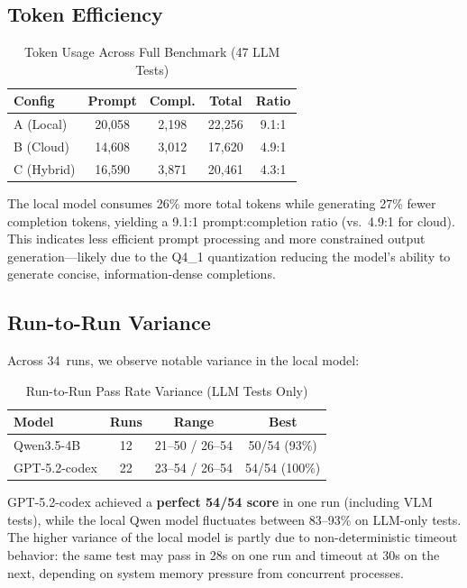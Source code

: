\documentclass[conference]{IEEEtran}
\begin{document}
\subsection{Token Efficiency}

\begin{table}[h]
\centering
\caption{Token Usage Across Full Benchmark (47 LLM Tests)}
\label{tab:tokens}
\begin{tabular}{lcccc}
\toprule
\textbf{Config} & \textbf{Prompt} & \textbf{Compl.} & \textbf{Total} & \textbf{Ratio} \\
\midrule
A (Local) & 20,058 & 2,198 & 22,256 & 9.1:1 \\
B (Cloud) & 14,608 & 3,012 & 17,620 & 4.9:1 \\
C (Hybrid) & 16,590 & 3,871 & 20,461 & 4.3:1 \\
\bottomrule
\end{tabular}
\end{table}

The local model consumes 26\% more total tokens while generating 27\%
fewer completion tokens, yielding a 9.1:1 prompt:completion ratio
(vs.\ 4.9:1 for cloud). This indicates less efficient prompt processing
and more constrained output generation---likely due to the Q4\_1
quantization reducing the model's ability to generate concise,
information-dense completions.

\subsection{Run-to-Run Variance}

Across 34~runs, we observe notable variance in the local model:

\begin{table}[h]
\centering
\caption{Run-to-Run Pass Rate Variance (LLM Tests Only)}
\label{tab:variance}
\begin{tabular}{lccc}
\toprule
\textbf{Model} & \textbf{Runs} & \textbf{Range} & \textbf{Best} \\
\midrule
Qwen3.5-4B & 12 & 21--50 / 26--54 & 50/54 (93\%) \\
GPT-5.2-codex & 22 & 23--54 / 26--54 & 54/54 (100\%) \\
\bottomrule
\end{tabular}
\end{table}

GPT-5.2-codex achieved a \textbf{perfect 54/54 score} in one run
(including VLM tests), while the local Qwen model fluctuates between
83--93\% on LLM-only tests. The higher variance of the local model
is partly due to non-deterministic timeout behavior: the same test may
pass in 28s on one run and timeout at 30s on the next, depending on
system memory pressure from concurrent processes.
\end{document}

